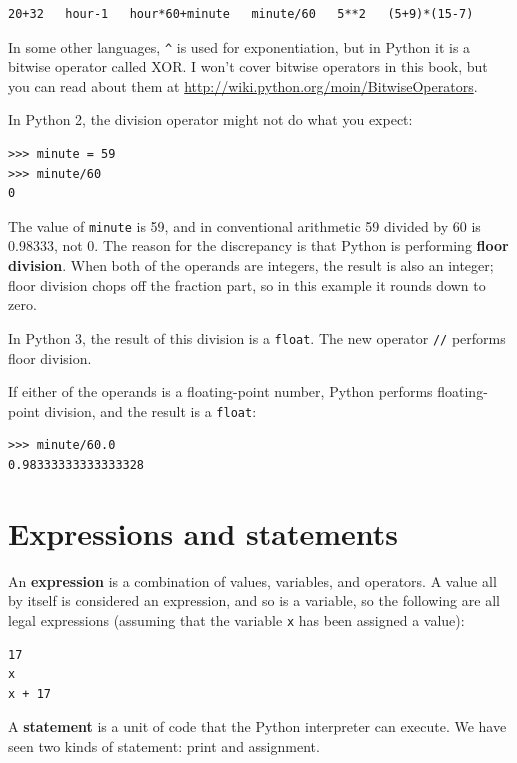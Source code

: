 \documentclass[10pt]{book}
\begin{document}
\begin{verbatim}
20+32   hour-1   hour*60+minute   minute/60   5**2   (5+9)*(15-7)
\end{verbatim}
%
In some other languages, \verb"^" is used for exponentiation, but
in Python it is a bitwise operator called XOR.  I won't cover
bitwise operators in this book, but you can read about
them at \url{http://wiki.python.org/moin/BitwiseOperators}.

In Python 2, the division operator might not do what you expect:

\begin{verbatim}
>>> minute = 59
>>> minute/60
0
\end{verbatim}
%
The value of {\tt minute} is 59, and in conventional arithmetic 59
divided by 60 is 0.98333, not 0.  The reason for the discrepancy is
that Python is performing {\bf floor division}.
When both of the operands are integers, the result is also an
integer; floor division chops off the fraction
part, so in this example it rounds down to zero.

In Python 3, the result of this division is a {\tt float}.  The new operator
{\tt //} performs floor division.

If either of the operands is a floating-point number, Python performs
floating-point division, and the result is a {\tt float}:

\begin{verbatim}
>>> minute/60.0
0.98333333333333328
\end{verbatim}


\section{Expressions and statements}

An {\bf expression} is a combination of values, variables, and operators.
A value all by itself is considered an expression, and so is
a variable, so the following are all legal expressions
(assuming that the variable {\tt x} has been assigned a value):

\begin{verbatim}
17
x
x + 17
\end{verbatim}
%
A {\bf statement} is a unit of code that the Python interpreter can
execute.  We have seen two kinds of statement: print and
assignment.
\end{document}
